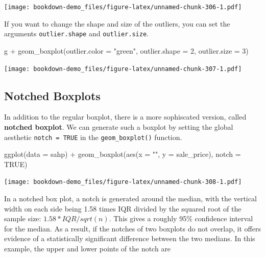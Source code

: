 \documentclass[
]{book}
\newenvironment{Shaded}{\begin{snugshade}}{\end{snugshade}}
\newcommand{\AttributeTok}[1]{\textcolor[rgb]{0.77,0.63,0.00}{#1}}
\newcommand{\ConstantTok}[1]{\textcolor[rgb]{0.00,0.00,0.00}{#1}}
\newcommand{\DecValTok}[1]{\textcolor[rgb]{0.00,0.00,0.81}{#1}}
\newcommand{\FunctionTok}[1]{\textcolor[rgb]{0.00,0.00,0.00}{#1}}
\newcommand{\NormalTok}[1]{#1}
\newcommand{\SpecialCharTok}[1]{\textcolor[rgb]{0.00,0.00,0.00}{#1}}
\newcommand{\StringTok}[1]{\textcolor[rgb]{0.31,0.60,0.02}{#1}}
\begin{document}
\texttt{[image: bookdown-demo\_files/figure-latex/unnamed-chunk-306-1.pdf]}

If you want to change the shape and size of the outliers, you can set the arguments \texttt{outlier.shape} and \texttt{outlier.size}.

\begin{Shaded}
\begin{Highlighting}[]
\NormalTok{g }\SpecialCharTok{+} \FunctionTok{geom\_boxplot}\NormalTok{(}\AttributeTok{outlier.color =} \StringTok{"green"}\NormalTok{, }\AttributeTok{outlier.shape =} \DecValTok{2}\NormalTok{, }\AttributeTok{outlier.size =} \DecValTok{3}\NormalTok{)}
\end{Highlighting}
\end{Shaded}

\texttt{[image: bookdown-demo\_files/figure-latex/unnamed-chunk-307-1.pdf]}

\hypertarget{notched-boxplots}{%
\subsection{Notched Boxplots}\label{notched-boxplots}}

In addition to the regular boxplot, there is a more sophiscated version, called \textbf{notched boxplot}. We can generate such a boxplot by setting the global aesthetic \texttt{notch\ =\ TRUE} in the \texttt{geom\_boxplot()} function.

\begin{Shaded}
\begin{Highlighting}[]
\FunctionTok{ggplot}\NormalTok{(}\AttributeTok{data =}\NormalTok{ sahp) }\SpecialCharTok{+} \FunctionTok{geom\_boxplot}\NormalTok{(}\FunctionTok{aes}\NormalTok{(}\AttributeTok{x =} \StringTok{""}\NormalTok{, }\AttributeTok{y =}\NormalTok{ sale\_price), }\AttributeTok{notch =} \ConstantTok{TRUE}\NormalTok{)}
\end{Highlighting}
\end{Shaded}

\texttt{[image: bookdown-demo\_files/figure-latex/unnamed-chunk-308-1.pdf]}

In a notched box plot, a notch is generated around the median, with the vertical width on each side being 1.58 times IQR divided by the squared root of the sample size: \(1.58 * IQR / sqrt(n)\). This gives a roughly 95\% confidence interval for the median. As a result, if the notches of two boxplots do not overlap, it offers evidence of a statistically significant difference between the two medians. In this example, the upper and lower points of the notch are
\end{document}
